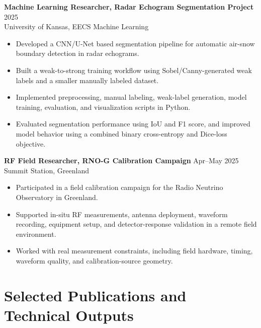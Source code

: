 \documentclass[10pt,letterpaper]{article}
\begin{document}
\textbf{Machine Learning Researcher, Radar Echogram Segmentation Project} \hfill 2025\\
University of Kansas, EECS Machine Learning
\begin{itemize}
    \item Developed a CNN/U-Net based segmentation pipeline for automatic air-snow boundary detection in radar echograms.
    \item Built a weak-to-strong training workflow using Sobel/Canny-generated weak labels and a smaller manually labeled dataset.
    \item Implemented preprocessing, manual labeling, weak-label generation, model training, evaluation, and visualization scripts in Python.
    \item Evaluated segmentation performance using IoU and F1 score, and improved model behavior using a combined binary cross-entropy and Dice-loss objective.
\end{itemize}

\textbf{RF Field Researcher, RNO-G Calibration Campaign} \hfill Apr--May 2025\\
Summit Station, Greenland
\begin{itemize}
    \item Participated in a field calibration campaign for the Radio Neutrino Observatory in Greenland.
    \item Supported in-situ RF measurements, antenna deployment, waveform recording, equipment setup, and detector-response validation in a remote field environment.
    \item Worked with real measurement constraints, including field hardware, timing, waveform quality, and calibration-source geometry.
\end{itemize}


\section*{Selected Publications and Technical Outputs}
\end{document}
